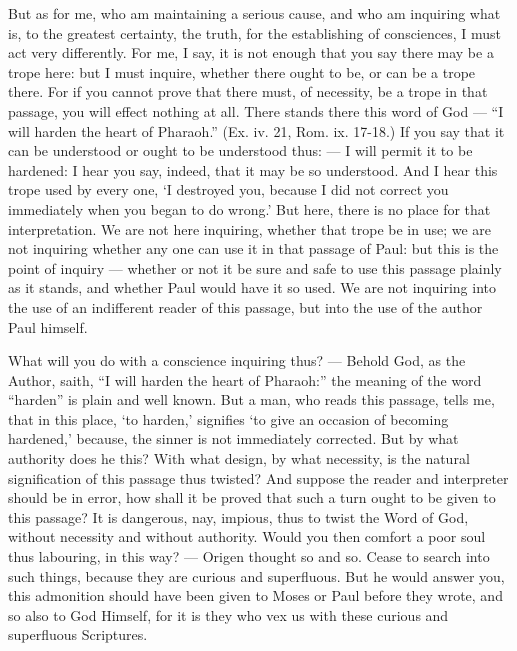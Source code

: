 But as for me, who am maintaining a serious cause, and who am inquiring what is, to the greatest certainty, the truth, for the establishing of consciences, I must act very differently. For me, I say, it is not enough that you say there may be a trope here: but I must inquire, whether there ought to be, or can be a trope there. For if you cannot prove that there must, of necessity, be a trope in that passage, you will effect nothing at all. There stands there this word of God — “I will harden the heart of Pharaoh.” (Ex. iv. 21, Rom. ix. 17-18.) If you say that it can be understood or ought to be understood thus: — I will permit it to be hardened: I hear you say, indeed, that it may be so understood. And I hear this trope used by every one, ‘I destroyed you, because I did not correct you immediately when you began to do wrong.’ But here, there is no place for that interpretation. We are not here inquiring, whether that trope be in use; we are not inquiring whether any one can use it in that passage of Paul: but this is the point of inquiry — whether or not it be sure and safe to use this passage plainly as it stands, and whether Paul would have it so used. We are not inquiring into the use of an indifferent reader of this passage, but into the use of the author Paul himself.

What will you do with a conscience inquiring thus? — Behold God, as the Author, saith, “I will harden the heart of Pharaoh:” the meaning of the word “harden” is plain and well known. But a man, who reads this passage, tells me, that in this place, ‘to harden,’ signifies ‘to give an occasion of becoming hardened,’ because, the sinner is not immediately corrected. But by what authority does he this? With what design, by what necessity, is the natural signification of this passage thus twisted? And suppose the reader and interpreter should be in error, how shall it be proved that such a turn ought to be given to this passage? It is dangerous, nay, impious, thus to twist the Word of God, without necessity and without authority. Would you then comfort a poor soul thus labouring, in this way? — Origen thought so and so. Cease to search into such things, because they are curious and superfluous. But he would answer you, this admonition should have been given to Moses or Paul before they wrote, and so also to God Himself, for it is they who vex us with these curious and superfluous Scriptures.


